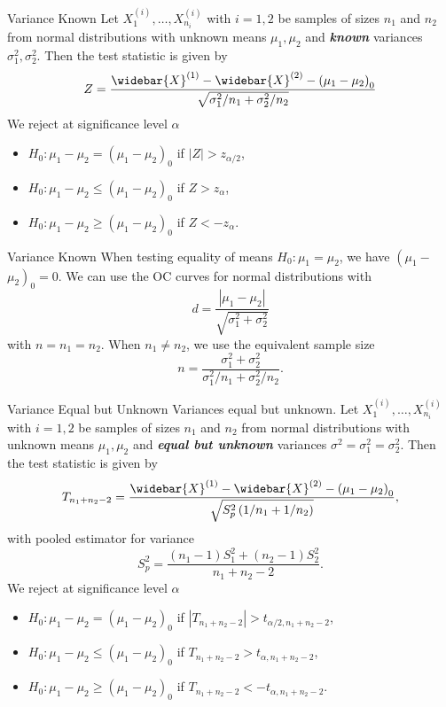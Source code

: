 \documentclass{beamer}
\newcommand{\bb}[1]{\textcolor{antiquefuchsia}{\textbf{\textit{#1}}}}
\begin{document}
\begin{frame}{Variance Known}
Let $X_{1}^{(i)}, \ldots, X_{n_{i}}^{(i)}$ with $i=1,2$ be samples of sizes $n_{1}$ and $n_{2}$ from normal distributions with unknown means $\mu_{1}, \mu_{2}$ and \bb{known} variances $\sigma_{1}^{2}, \sigma_{2}^{2}$. Then the test statistic is given by
$$
Z=\frac{\widebar{X}^{(1)}-\widebar{X}^{(2)}-\left(\mu_{1}-\mu_{2}\right)_{0}}{\sqrt{\sigma_{1}^{2} / n_{1}+\sigma_{2}^{2} / n_{2}}}
$$
We reject at significance level $\alpha$
\begin{itemize}
\item $H_{0}: \mu_{1}-\mu_{2}=\left(\mu_{1}-\mu_{2}\right)_{0}$ if $|Z|>z_{\alpha / 2}$,
\item $H_{0}: \mu_{1}-\mu_{2} \leq\left(\mu_{1}-\mu_{2}\right)_{0}$ if $Z>z_{\alpha}$,
\item $H_{0}: \mu_{1}-\mu_{2} \geq\left(\mu_{1}-\mu_{2}\right)_{0}$ if $Z<-z_{\alpha}$.
\end{itemize}
\end{frame}

\begin{frame}{Variance Known}
When testing equality of means $H_{0}: \mu_{1}=\mu_{2}$, we have $\left(\mu_{1}-\right.$ $\left.\mu_{2}\right)_{0}=0$. We can use the OC curves for normal distributions with
$$
d=\frac{\left|\mu_{1}-\mu_{2}\right|}{\sqrt{\sigma_{1}^{2}+\sigma_{2}^{2}}}
$$
with $n=n_{1}=n_{2}$. When $n_{1} \neq n_{2}$, we use the equivalent sample size
$$
n=\frac{\sigma_{1}^{2}+\sigma_{2}^{2}}{\sigma_{1}^{2} / n_{1}+\sigma_{2}^{2} / n_{2}} .
$$
\end{frame}

\begin{frame}{Variance Equal but Unknown}
Variances equal but unknown. Let $X_{1}^{(i)}, \ldots, X_{n_{i}}^{(i)}$ with $i=1,2$ be samples of sizes $n_{1}$ and $n_{2}$ from normal distributions with unknown means $\mu_{1}, \mu_{2}$ and \bb{equal but unknown} variances $\sigma^{2}=\sigma_{1}^{2}=\sigma_{2}^{2}$. Then the test statistic is given by
$$
T_{n_{1}+n_{2}-2}=\frac{\widebar{X}^{(1)}-\widebar{X}^{(2)}-\left(\mu_{1}-\mu_{2}\right)_{0}}{\sqrt{S_{p}^{2}\left(1 / n_{1}+1 / n_{2}\right)}},
$$
with pooled estimator for variance
$$
S_{p}^{2}=\frac{\left(n_{1}-1\right) S_{1}^{2}+\left(n_{2}-1\right) S_{2}^{2}}{n_{1}+n_{2}-2} .
$$
We reject at significance level $\alpha$
\begin{itemize}
\item $H_{0}: \mu_{1}-\mu_{2}=\left(\mu_{1}-\mu_{2}\right)_{0}$ if $\left|T_{n_{1}+n_{2}-2}\right|>t_{\alpha / 2, n_{1}+n_{2}-2}$,
\item $H_{0}: \mu_{1}-\mu_{2} \leq\left(\mu_{1}-\mu_{2}\right)_{0}$ if $T_{n_{1}+n_{2}-2}>t_{\alpha, n_{1}+n_{2}-2}$,
\item $H_{0}: \mu_{1}-\mu_{2} \geq\left(\mu_{1}-\mu_{2}\right)_{0}$ if $T_{n_{1}+n_{2}-2}<-t_{\alpha, n_{1}+n_{2}-2}$.
\end{itemize}
\end{frame}
\end{document}
